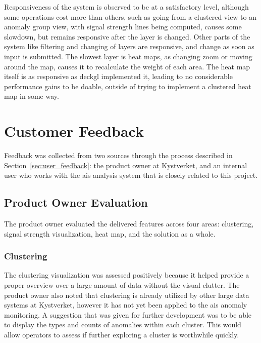 Responsiveness of the system is observed to be at a satisfactory level, although some operations cost more than others, such as going from a clustered view to an anomaly group view, with signal strength lines being computed, causes some slowdown, but remains responsive after the layer is changed. Other parts of the system like filtering and changing of layers are responsive, and change as soon as input is submitted. The slowest layer is heat maps, as changing zoom or moving around the map, causes it to recalculate the weight of each area. The heat map itself is as responsive as \gls{deckgl} implemented it, leading to no considerable performance gains to be doable, outside of trying to implement a clustered heat map in some way.

\section{Customer Feedback}
\label{sec:customer_feedback}

Feedback was collected from two sources through the process described in Section~\ref{sec:user_feedback}: the product owner at Kystverket, and an internal user who works with the \acrshort{ais} analysis system that is closely related to this project.

\subsection{Product Owner Evaluation}

The product owner evaluated the delivered features across four areas: clustering, signal strength visualization, heat map, and the solution as a whole.

\subsubsection{Clustering}

The clustering visualization was assessed positively because it helped provide a proper overview over a large amount of data without the visual clutter. The product owner also noted that clustering is already utilized by other large data systems at Kystverket, however it has not yet been applied to the \acrshort{ais} anomaly monitoring. A suggestion that was given for further development was to be able to display the types and counts of anomalies within each cluster. This would allow operators to assess if further exploring a cluster is worthwhile quickly.

